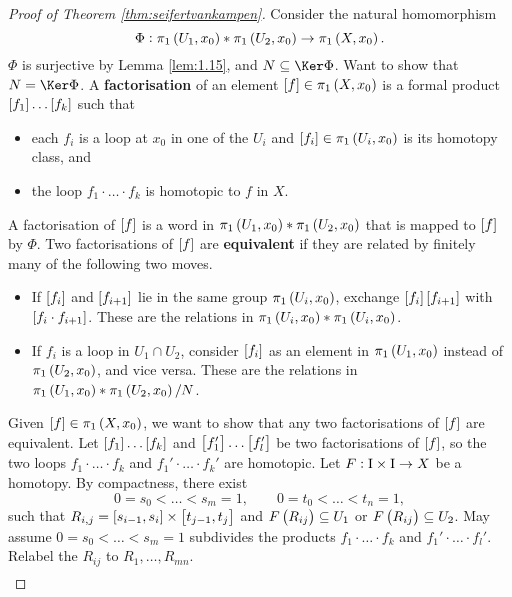 \begin{proof}[Proof of Theorem \ref{thm:seifertvankampen}]
Consider the natural homomorphism
$$ \Phi : \pi_1\br{U_1, x_0} * \pi_1\br{U_2, x_0} \to \pi_1\br{X, x_0}. $$
$ \Phi $ is surjective by Lemma \ref{lem:1.15}, and $ N \subseteq \Ker \Phi $. Want to show that $ N = \Ker \Phi $. A \textbf{factorisation} of an element $ \sbr{f} \in \pi_1\br{X, x_0} $ is a formal product $ \sbr{f_1} \dots \sbr{f_k} $ such that
\begin{itemize}
\item each $ f_i $ is a loop at $ x_0 $ in one of the $ U_i $ and $ \sbr{f_i} \in \pi_1\br{U_i, x_0} $ is its homotopy class, and
\item the loop $ f_1 \cdot \dots \cdot f_k $ is homotopic to $ f $ in $ X $.
\end{itemize}
A factorisation of $ \sbr{f} $ is a word in $ \pi_1\br{U_1, x_0} * \pi_1\br{U_2, x_0} $ that is mapped to $ \sbr{f} $ by $ \Phi $. Two factorisations of $ \sbr{f} $ are \textbf{equivalent} if they are related by finitely many of the following two moves.
\begin{itemize}
\item If $ \sbr{f_i} $ and $ \sbr{f_{i + 1}} $ lie in the same group $ \pi_1\br{U_i, x_0} $, exchange $ \sbr{f_i}\sbr{f_{i + 1}} $ with $ \sbr{f_i \cdot f_{i + 1}} $. These are the relations in $ \pi_1\br{U_i, x_0} * \pi_1\br{U_i, x_0} $.
\item If $ f_i $ is a loop in $ U_1 \cap U_2 $, consider $ \sbr{f_i} $ as an element in $ \pi_1\br{U_1, x_0} $ instead of $ \pi_1\br{U_2, x_0} $, and vice versa. These are the relations in $ \pi_1\br{U_1, x_0} * \pi_1\br{U_2, x_0} / N $.
\end{itemize}
Given $ \sbr{f} \in \pi_1\br{X, x_0} $, we want to show that any two factorisations of $ \sbr{f} $ are equivalent. Let $ \sbr{f_1} \dots \sbr{f_k} $ and $ \sbr{f_1'} \dots \sbr{f_l'} $ be two factorisations of $ \sbr{f} $, so the two loops $ f_1 \cdot \dots \cdot f_k $ and $ f_1' \cdot \dots \cdot f_k' $ are homotopic. Let $ F : \I \times \I \to X $ be a homotopy. By compactness, there exist
$$ 0 = s_0 < \dots < s_m = 1, \qquad 0 = t_0 < \dots < t_n = 1, $$
such that $ R_{i, j} = \sbr{s_{i - 1}, s_i} \times \sbr{t_{j - 1}, t_j} $ and $ F\br{R_{ij}} \subseteq U_1 $ or $ F\br{R_{ij}} \subseteq U_2 $. May assume $ 0 = s_0 < \dots < s_m = 1 $ subdivides the products $ f_1 \cdot \dots \cdot f_k $ and $ f_1' \cdot \dots \cdot f_l' $. Relabel the $ R_{ij} $ to $ R_1, \dots, R_{mn} $.
$$
\begin{array}{|c|c|c|}

\end{array}$$
\end{proof}
